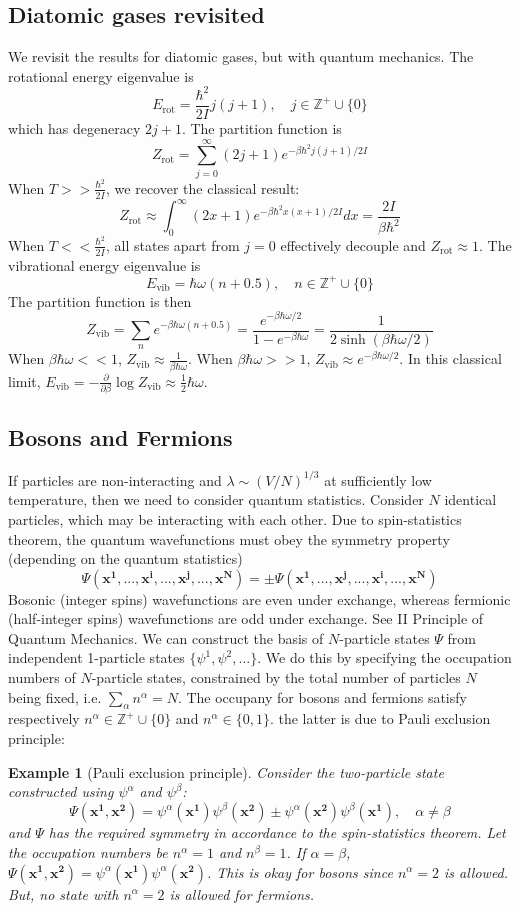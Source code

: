 \documentclass[a4paper]{article}
\newtheorem{eg}{Example}[section]
\theoremstyle{new}
\begin{document}
\subsection{Diatomic gases revisited}
We revisit the results for diatomic gases, but with quantum mechanics. The rotational energy eigenvalue is
$$E_{\text{rot}}=\frac{\hbar^2}{2I}j(j+1),\quad j\in\mathbb{Z}^+\cup\{0\}$$
which has degeneracy $2j+1$. The partition function is
$$Z_{\text{rot}}=\sum_{j=0}^\infty(2j+1)e^{-\beta\hbar^2j(j+1)/2I}$$
When $T>>\frac{\hbar^2}{2I}$, we recover the classical result:
$$Z_{\text{rot}}\approx\int_0^\infty (2x+1)e^{-\beta\hbar^2x(x+1)/2I}dx=\frac{2I}{\beta\hbar^2}$$
When $T<<\frac{\hbar^2}{2I}$, all states apart from $j=0$ effectively decouple and $Z_{\text{rot}}\approx1$. The vibrational energy eigenvalue is
$$E_{\text{vib}}=\hbar\omega(n+0.5),\quad n\in\mathbb{Z}^+\cup\{0\}$$
The partition function is then
$$Z_{\text{vib}}=\sum_ne^{-\beta\hbar\omega(n+0.5)}=\frac{e^{-\beta\hbar\omega/2}}{1-e^{-\beta\hbar\omega}}=\frac{1}{2\sinh(\beta\hbar\omega/2)}$$
When $\beta\hbar\omega<<1$, $Z_{\text{vib}}\approx\frac{1}{\beta\hbar\omega}$. When $\beta\hbar\omega>>1$, $Z_{\text{vib}}\approx e^{-\beta\hbar\omega/2}$. In this classical limit, $E_{\text{vib}}=-\frac{\partial}{\partial\beta}\log Z_{\text{vib}}\approx\frac{1}{2}\hbar\omega$.
\subsection{Bosons and Fermions}
If particles are non-interacting and $\lambda\sim(V/N)^{1/3}$ at sufficiently low temperature, then we need to consider quantum statistics. Consider $N$ identical particles, which may be interacting with each other. Due to spin-statistics theorem, the quantum wavefunctions must obey the symmetry property (depending on the quantum statistics)
$$\Psi(\mathbf{x^1},...,\mathbf{x^i},...,\mathbf{x^j},...,\mathbf{x^N})=\pm\Psi(\mathbf{x^1},...,\mathbf{x^j},...,\mathbf{x^i},...,\mathbf{x^N})$$
Bosonic (integer spins) wavefunctions are even under exchange, whereas fermionic (half-integer spins) wavefunctions are odd under exchange. See II Principle of Quantum Mechanics. We can construct the basis of $N$-particle states $\Psi$ from independent 1-particle states $\{\psi^1, \psi^2,...\}$.  We do this by specifying the occupation numbers of $N$-particle states, constrained by the total number of particles $N$ being fixed, i.e. $\sum_\alpha n^\alpha=N$. The occupany for bosons and fermions satisfy respectively $n^\alpha\in\mathbb{Z}^+\cup\{0\}$ and $n^\alpha\in\{0,1\}$. the latter is due to Pauli exclusion principle:
\begin{eg}[Pauli exclusion principle]
Consider the two-particle state constructed using $\psi^\alpha$ and $\psi^\beta$:
$$\Psi(\mathbf{x^1},\mathbf{x^2})=\psi^\alpha(\mathbf{x^1})\psi^\beta(\mathbf{x^2})\pm\psi^\alpha(\mathbf{x^2})\psi^\beta(\mathbf{x^1}),\quad\alpha\neq\beta$$
and $\Psi$ has the required symmetry in accordance to the spin-statistics theorem. Let the occupation numbers be $n^\alpha=1$ and $n^\beta =1$. If $\alpha=\beta$, $\Psi(\mathbf{x^1},\mathbf{x^2})=\psi^\alpha(\mathbf{x^1})\psi^\alpha(\mathbf{x^2})$. This is okay for bosons since $n^\alpha=2$ is allowed. But, no state with $n^\alpha=2$ is allowed for fermions.
\end{eg}
\newpage
\end{document}
